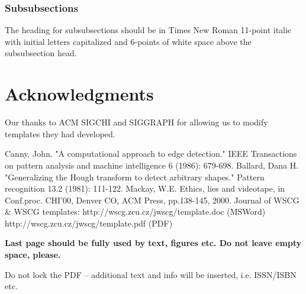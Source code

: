 \documentclass[twoside,twocolumn,10pt]{article}
\begin{document}
\subsubsection{Subsubsections}
The heading for subsubsections should be in Times New Roman 11-point italic with initial letters capitalized and 6-points of white space above the subsubsection head.

\section{Acknowledgments}
Our thanks to ACM SIGCHI and SIGGRAPH for allowing us to modify templates they had developed.

%
%



\begin{thebibliography}{99}
\label{references}
 Canny, John. "A computational approach to edge detection." IEEE Transactions on pattern analysis and machine intelligence 6 (1986): 679-698.
 Ballard, Dana H. "Generalizing the Hough transform to detect arbitrary shapes." Pattern recognition 13.2 (1981): 111-122.
 Mackay, W.E. Ethics, lies and videotape, in Conf.proc. CHI'00, Denver CO, ACM Press, pp.138-145, 2000.
 Journal of WSCG \& WSCG templates: http://wscg.zcu.cz/jwscg/template.doc (MSWord)
http://wscg.zcu.cz/jwscg/template.pdf (PDF)
\end{thebibliography}

{\bfseries
Last page should be fully used by text, figures etc. Do not leave empty space, please. 

Do not lock the PDF -- additional text and info will be inserted, i.e. ISSN/ISBN etc. 
}
\end{document}
